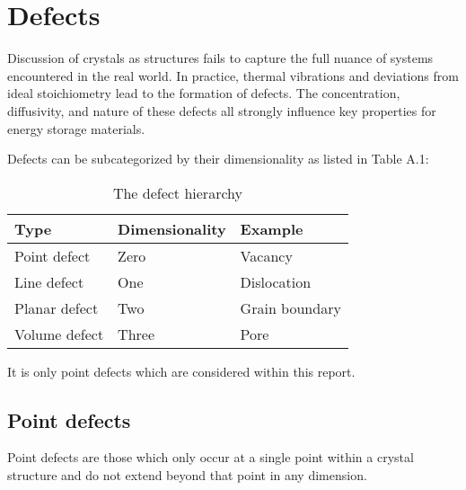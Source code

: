 \appendix
\chapter{Defects}
Discussion of crystals as structures fails to capture the full nuance of systems encountered in the real world.
In practice, thermal vibrations and deviations from ideal stoichiometry lead to the formation of defects.
The concentration, diffusivity, and nature of these defects all strongly influence key properties for energy storage materials.


Defects can be subcategorized by their dimensionality as listed in Table A.1:

\begin{table}[bh!]
\centering
\label{tab:defecthierarchy}
\caption{The defect hierarchy \citep{Carter2013}}
\begin{tabular}{@{}lll@{}}
\toprule
Type            & Dimensionality  & Example\\
\midrule
Point defect    & Zero            & Vacancy\\
Line defect     & One             & Dislocation\\
Planar defect   & Two             & Grain boundary\\
Volume defect   & Three           & Pore\\
\bottomrule
\end{tabular}
\end{table}

It is only point defects which are considered within this report.
\newpage
\section{Point defects}
Point defects are those which only occur at a single point within a crystal structure and do not extend beyond that point in any dimension.




